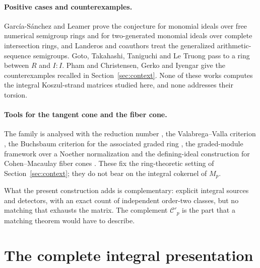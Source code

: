 \documentclass[11pt]{article}
\theoremstyle{definition}
\theoremstyle{remark}
\begin{document}
\paragraph{Positive cases and counterexamples.} Garc\'ia-S\'anchez and Leamer
\cite{GarciaSanchezLeamer} prove the conjecture for monomial ideals over free
numerical semigroup rings and for two-generated monomial ideals over complete
intersection rings, and Landeros and coauthors \cite{Landeros} treat the
generalized arithmetic-sequence semigroups. Goto, Takahashi, Taniguchi and Le Truong
\cite{Goto} pass to a ring between $R$ and $I{:}I$. Pham \cite{Pham,PhamRepo} and
Christensen, Gerko and Iyengar \cite{CGI} give the counterexamples recalled in
Section~\ref{sec:context}. None of these works computes the integral Koszul-strand
matrices studied here, and none addresses their torsion.

\paragraph{Tools for the tangent cone and the fiber cone.} The family is analysed
with the reduction number \cite{NorthcottRees}, the Valabrega--Valla criterion
\cite{ValabregaValla}, the Buchsbaum criterion for the associated graded ring
\cite{DAnnaMezzasalma,DAnnaMicale}, the graded-module framework over a Noether
normalization \cite{CortadellasZarzuelaA,CortadellasZarzuelaB} and the
defining-ideal construction for Cohen--Macaulay fiber cones
\cite{AbdolmalekiKumashiro}. These fix the ring-theoretic setting of
Section~\ref{sec:context}; they do not bear on the integral cokernel of $M_p$.

What the present construction adds is complementary: explicit integral sources
and detectors, with an exact count of independent order-two classes, but no
matching that exhausts the matrix. The complement $\mathcal C'_p$ is the part
that a matching theorem would have to describe.

\section{The complete integral presentation}\label{sec:matrix}
\end{document}
